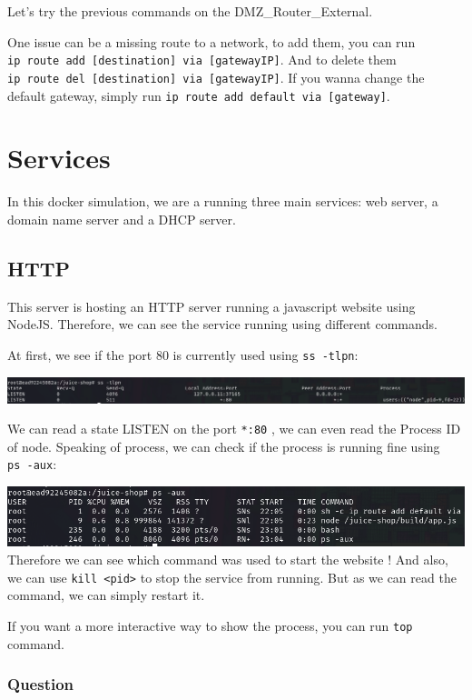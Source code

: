 \documentclass[a4paper,11pt,singlespacing]{article}
\begin{document}
Let's try the previous commands on the DMZ\_Router\_External.

One issue can be a missing route to a network, to add them, you can run
\texttt{ip\ route\ add\ {[}destination{]}\ via\ {[}gatewayIP{]}}. And to
delete them
\texttt{ip\ route\ del\ {[}destination{]}\ via\ {[}gatewayIP{]}}. If you
wanna change the default gateway, simply run
\texttt{ip\ route\ add\ default\ via\ {[}gateway{]}}.

\section{Services}\label{services}

In this docker simulation, we are a running three main services: web
server, a domain name server and a DHCP server.

\subsection{HTTP}\label{http}

This server is hosting an HTTP server running a javascript website using
NodeJS. Therefore, we can see the service running using different
commands.

At first, we see if the port 80 is currently used using
\texttt{ss\ -tlpn}:

\includegraphics{Images/Image06.png}

We can read a state LISTEN on the port \texttt{*:80} , we can even read
the Process ID of node. Speaking of process, we can check if the process
is running fine using \texttt{ps\ -aux}:

\includegraphics{Images/Image07.png}
Therefore we can see which command was used to start the website ! And
also, we can use \texttt{kill\ \textless{}pid\textgreater{}} to stop the
service from running. But as we can read the command, we can simply
restart it.

If you want a more interactive way to show the process, you can run
\texttt{top} command.

\subsubsection{Question}\label{question}
\end{document}
